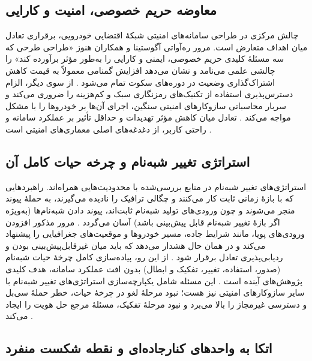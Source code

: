 \documentclass[12pt,a4paper]{article}
\begin{document}
\subsection{معاوضه حریم خصوصی، امنیت و کارایی}

چالش مرکزی در طراحی سامانه‌های امنیتی شبکهٔ اقتضایی خودرویی، برقراری تعادل میان اهداف متعارض است. مرور ره‌آواتی آگوستینا و همکاران هنوز «طراحی طرحی که سه مسئلهٔ کلیدی حریم خصوصی، ایمنی و کارایی را به‌طور مؤثر برآورده کند» را چالشی علمی می‌نامد و نشان می‌دهد افزایش گمنامی معمولاً به قیمت کاهش اشتراک‌گذاری وضعیت در دوره‌های سکوت تمام می‌شود \cite{al-aniPrivacySafetyImprovement2023}. از سوی دیگر، الزام دسترس‌پذیری استفاده از تکنیک‌های رمزنگاری سبک و کم‌هزینه را ضروری می‌کند و سربار محاسباتی سازوکار‌های امنیتی سنگین، اجرای آن‌ها بر خودرو‌ها را با مشکل مواجه می‌کند \cite{farsimadanReviewSecurityChallenges2025}. تعادل میان کاهش مؤثر تهدیدات و حداقل تأثیر بر عملکرد سامانه و راحتی کاربر، از دغدغه‌های اصلی معماری‌های امنیتی است \cite{SecuringVehicularAd}.

\subsection{استراتژی تغییر شبه‌نام و چرخه حیات کامل آن}

استراتژی‌های تغییر شبه‌نام در منابع بررسی‌شده با محدودیت‌هایی همراه‌اند. راهبرد‌هایی که با بازهٔ زمانی ثابت کار می‌کنند و چگالی ترافیک را نادیده می‌گیرند، به حملهٔ پیوند منجر می‌شوند و چون ورودی‌های تولید شبه‌نام ثابت‌اند، پیوند دادن شبه‌نام‌ها (به‌ویژه اگر بازهٔ تغییر شبه‌نام قابل پیش‌بینی باشد) آسان می‌گردد \cite{rahmawatiagustinaSystematicLiteratureReview2025}. مرور مذکور افزودن ورودی‌های پویا، مانند شرایط جاده، مسیر خودرو‌ها و موقعیت‌های جغرافیایی را پیشنهاد می‌کند و در همان حال هشدار می‌دهد که باید میان غیرقابل‌پیش‌بینی بودن و ردیابی‌پذیری تعادل برقرار شود \cite{rahmawatiagustinaSystematicLiteratureReview2025}. از این رو، پیاده‌سازی کامل چرخهٔ حیات شبه‌نام (صدور، استفاده، تغییر، تفکیک و ابطال) بدون افت عملکرد سامانه، هدف کلیدی پژوهش‌های آینده است \cite{rahmawatiagustinaSystematicLiteratureReview2025}. این مسئله شامل یکپارچه‌سازی استراتژی‌های تغییر شبه‌نام با سایر سازوکار‌های امنیتی نیز هست؛ نبود مرحلهٔ لغو در چرخهٔ حیات، خطر حملهٔ سی‌بل و دسترسی غیرمجاز را بالا می‌برد و نبود مرحلهٔ تفکیک، مسئلهٔ مرجع حل هویت را ایجاد می‌کند \cite{rahmawatiagustinaSystematicLiteratureReview2025}.

\subsection{اتکا به واحد‌های کنارجاده‌ای و نقطه شکست منفرد}
\end{document}
